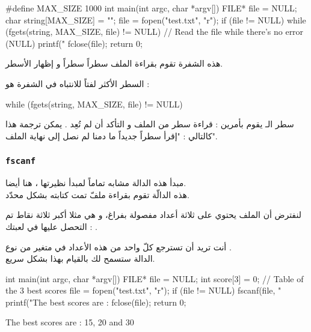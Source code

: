 \begin{Csource}
#define MAX_SIZE 1000
int main(int argc, char *argv[])
{
    FILE* file = NULL;
    char string[MAX_SIZE] = "";
    file = fopen("test.txt", "r");
    if (file != NULL)
    {
        while (fgets(string, MAX_SIZE, file) != NULL) // Read the file while there's no error (NULL)
        {
            printf("%
        }
        fclose(file);
    }
    return 0;
}
\end{Csource}

هذه الشفرة تقوم بقراءة الملف سطراً سطراً و إظهار الأسطر.

السطر الأكثر لفتاً للانتباه في الشفرة هو :

\begin{Csource}
while (fgets(string, MAX_SIZE, file) != NULL)
\end{Csource}

سطر الـ
يقوم بأمرين : قراءة سطر من الملف و التأكد أن
لم تُعِد
.
يمكن ترجمة هذا كالتالي : "إقرأ سطراً جديداً ما دمنا لم نصل إلى نهاية الملف".

\subsubsection{\texttt{fscanf}}
مبدأ هذه الدالة مشابه تماماً لمبدأ نظيرتها
،
هنا أيضا.\\
هذه الدالّة تقوم بقراءة ملفّ تمت كتابته بشكل محدّد.

لنفترض أن الملف يحتوي على ثلاثة أعداد مفصولة بفراغ، و هي مثلا أكبر ثلاثة نقاط تم التحصل عليها في لعبتك :
.

أنت تريد أن تسترجع كلّ واحد من هذه الأعداد في متغير من نوع
.\\
الدالة
ستسمح لك بالقيام بهذا بشكل سريع.

\begin{Csource}
int main(int argc, char *argv[])
{
  FILE* file = NULL;
  int score[3] = {0}; // Table of the 3 best scores
  file = fopen("test.txt", "r");
  if (file != NULL)
  {
    fscanf(file, "%
    printf("The best scores are : %
    fclose(file);
  }
  return 0;
}
\end{Csource}

\begin{Console}
The best scores are : 15, 20 and 30
\end{Console}

